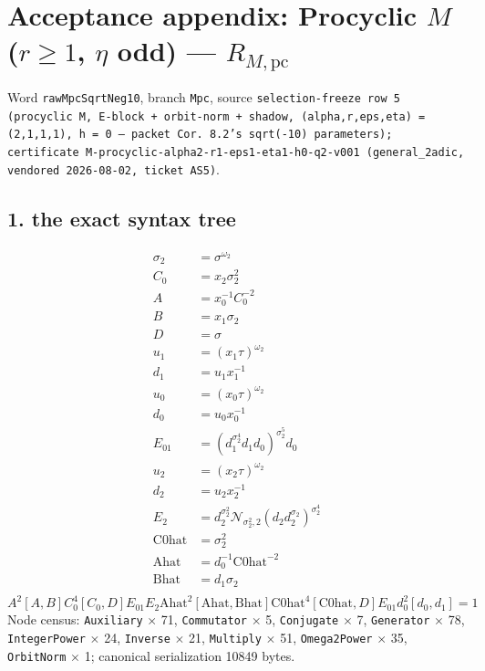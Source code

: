 %

\section{Acceptance appendix: Procyclic $M$ ($r \ge 1$, $\eta$ odd) --- $R_{M,\mathrm{pc}}$}
\label{sec:appendix-Mpc}

Word \texttt{rawMpcSqrtNeg10}, branch \texttt{Mpc}, source \texttt{selection-freeze row 5 (procyclic M, E-block + orbit-norm + shadow, (alpha,r,eps,eta) = (2,1,1,1), h = 0 — packet Cor. 8.2's sqrt(-10) parameters); certificate M-procyclic-alpha2-r1-eps1-eta1-h0-q2-v001 (general\_2adic, vendored 2026-08-02, ticket AS5)}.

\subsection{1. the exact syntax tree}
\begin{align*}
  \sigma_2 &= \sigma^{\omega_2}\\
  C_0 &= x_2\sigma_2^2\\
  A &= x_0^{-1}C_0^{-2}\\
  B &= x_1\sigma_2\\
  D &= \sigma\\
  u_1 &= (x_1\tau)^{\omega_2}\\
  d_1 &= u_1x_1^{-1}\\
  u_0 &= (x_0\tau)^{\omega_2}\\
  d_0 &= u_0x_0^{-1}\\
  E_{01} &= (d_1^{\sigma_2^4}d_1d_0)^{\sigma_2^5}d_0\\
  u_2 &= (x_2\tau)^{\omega_2}\\
  d_2 &= u_2x_2^{-1}\\
  E_2 &= d_2^{\sigma_2^2}\mathcal{N}_{\sigma_2^2,2}(d_2d_2^{\sigma_2})^{\sigma_2^4}\\
  \mathrm{C0hat} &= \sigma_2^2\\
  \mathrm{Ahat} &= d_0^{-1}\mathrm{C0hat}^{-2}\\
  \mathrm{Bhat} &= d_1\sigma_2\\
\end{align*}
\[ A^2[A,B]C_0^4[C_0,D]E_{01}E_2\mathrm{Ahat}^2[\mathrm{Ahat},\mathrm{Bhat}]\mathrm{C0hat}^4[\mathrm{C0hat},D]E_{01}d_0^2[d_0,d_1] = 1 \]
Node census: \texttt{Auxiliary} $\times$ 71, \texttt{Commutator} $\times$ 5, \texttt{Conjugate} $\times$ 7, \texttt{Generator} $\times$ 78, \texttt{IntegerPower} $\times$ 24, \texttt{Inverse} $\times$ 21, \texttt{Multiply} $\times$ 51, \texttt{Omega2Power} $\times$ 35, \texttt{OrbitNorm} $\times$ 1; canonical serialization 10849 bytes.

